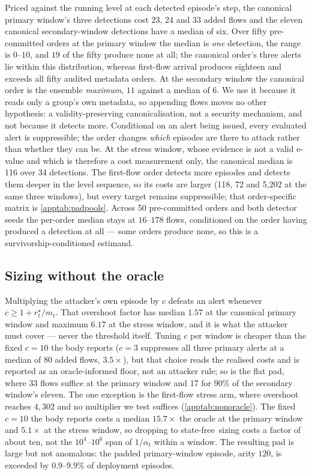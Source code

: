\documentclass[conference]{IEEEtran}
\newcommand{\alphat}{\alpha_t}
\newcommand{\statefree}{state\nobreakdash-free}
\begin{document}
Priced against the running level at each detected episode's step, the canonical primary window's three
detections cost 23, 24 and 33 added flows and the eleven canonical secondary-window detections have a
median of six. Over fifty pre-committed orders at the primary window the median is \emph{one}
detection, the range is $0$--$10$, and $19$ of the fifty produce none at all; the canonical order's three
alerts lie within this distribution, whereas first-flow arrival produces eighteen and exceeds all fifty
audited metadata orders. At the secondary window the canonical order is the ensemble \emph{maximum},
$11$ against a median of $6$. We use it because it reads only a group's own metadata, so appending flows
moves no other hypothesis: a validity-preserving canonicalisation, not a security mechanism, and not
because it detects more. Conditional on an alert being issued, every evaluated alert is suppressible;
the order changes \emph{which} episodes are there to attack rather than whether they can be. At the
stress window, whose evidence is not a valid e-value and which is therefore a cost measurement only, the
canonical median is 116 over 34 detections. The first-flow order detects more
episodes and detects them deeper in the level sequence, so its costs are larger (118, 72 and 5,202 at
the same three windows), but every target remains suppressible; that order-specific matrix is
\cref{apptab:padpools}. Across 50 pre-committed orders and both detector seeds the per-order median
stays at $16$--$178$ flows, conditioned on the order having produced a detection at all --- some orders
produce none, so this is a survivorship-conditioned estimand.

\subsection{Sizing without the oracle}\label{app:nonoracle}

Multiplying the attacker's own episode by $c$ defeats an alert whenever $c\ge1+r^{\star}_t/m_t$. That
overshoot factor has median $1.57$ at the canonical primary window and maximum $6.17$ at the stress
window, and it is what the attacker must cover --- never the threshold itself. Tuning $c$ per window is
cheaper than the fixed $c=10$ the body reports ($c=3$ suppresses all three primary alerts at a median of
80 added flows, $3.5\times$), but that choice reads the realised costs and is reported as an
oracle-informed floor, not an attacker rule; so is the flat pad, where 33 flows suffice at the primary
window and 17 for $90\%$ of the secondary window's eleven. The one exception is the first-flow stress
arm, where overshoot reaches $4{,}302$ and no multiplier we test suffices (\cref{apptab:nonoracle}).
The fixed $c=10$ the body reports costs a median $15.7\times$ the oracle at the primary window and
$5.1\times$ at the stress window, so dropping to \statefree\ sizing costs a factor of about ten, not the
$10^{4}$--$10^{6}$ span of $1/\alphat$ within a window. The resulting pad is large but not anomalous:
the padded primary-window episode, arity $120$, is exceeded by $0.9$--$9.9\%$ of deployment episodes.
\end{document}
